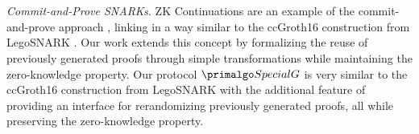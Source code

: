 \\\\
\noindent\textit{Commit-and-Prove SNARKs.} ZK Continuations are an example of the commit-and-prove approach \cite{LegoSNARK}, linking  in a way similar to the ccGroth16 construction from LegoSNARK \cite{LegoSNARK}. Our work extends this concept by formalizing the reuse of previously generated proofs through simple transformations while maintaining the zero-knowledge property. Our protocol $ \SpecialG $ is very similar to the ccGroth16 construction from LegoSNARK \cite{LegoSNARK} with the additional feature of providing an interface for rerandomizing previously generated proofs, all while preserving the zero-knowledge property. 